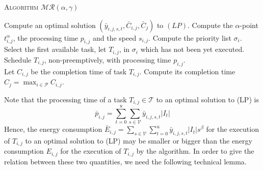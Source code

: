 \documentclass{llncs}
\newcommand{\algomr}{\textsc{Algorithm} $\mathcal{MR}(\alpha,\gamma)$\xspace}
\begin{document}
\begin{algorithm}
\algomr
\begin{algorithmic}[1]
\STATE Compute an optimal solution $(\bar{y}_{i,j,s,t}, \bar{C}_{i,j}, \bar{C}_j)$ to $(LP)$.
\STATE Compute the $\alpha$-point $\displaystyle t_{i,j}^{\alpha}$, the processing time $p_{i,j}$ and the speed $s_{i,j}$.
\ENDFOR
{}
\STATE Compute the priority list $\sigma_i$.
\ENDFOR
{}
\STATE Select the first available task, let $T_{i,j}$, in $\sigma_i$ which has not been yet executed.
\STATE Schedule $T_{i,j}$, non-preemptively, with processing time $p_{i,j}$.\\Let $C_{i,j}$ be the completion time of task $T_{i,j}$.
\ENDFOR
{}
\STATE Compute its completion time $C_j = \max_{i\in\mathcal{P}}C_{i,j}$.
\ENDFOR
\end{algorithmic}
\end{algorithm}

Note that the processing time of a task $T_{i,j} \in \mathcal{T}$ to an optimal solution to (LP) is
\begin{equation*}
\bar{p}_{i,j}=\sum_{t=0}^u \sum_{s\in\mathcal{V}} \bar{y}_{i,j,s,t}|I_t|
\end{equation*}
Hence, the energy consumption $\bar{E}_{i,j}=\sum_{s\in\mathcal{V}}\sum_{t=0}^u \bar{y}_{i,j,s,t}|I_t| s^{\beta}$
for the execution of $T_{i,j}$ to an optimal solution to (LP) may be smaller or bigger than
the energy consumption $E_{i,j}$ for the execution of $T_{i,j}$ by the algorithm.
In order to give the relation between these two quantities, we need the following technical lemma.
\end{document}

